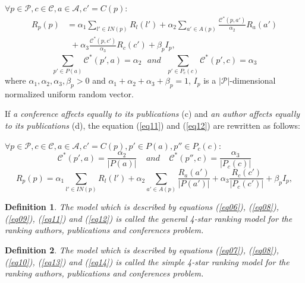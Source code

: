\documentclass[10pt,leqno,twoside]{article}
\newtheorem{definition}{\indent Definition}[section]
\begin{document}
\begin{enumerate}
$\forall p\in\mathcal{P},  c\in\mathcal{C},  a\in\mathcal{A},c' = C(p):$
\begin{equation} \label {eq11}
\begin{split}
R_p(p) &= \alpha_1\sum_{l'\in IN(p)}R_l(l') +  \alpha_2 \sum_{a'\in A(p)}\frac{\mathcal{C}^*(p,a')}{\alpha_2}R_a(a')\\ 
&~~ + \alpha_3\frac{\mathcal{C}^*(p,c')}{\alpha_3}R_c(c')+ \beta_pI_p,
\end{split}
\end{equation}
\begin{equation}\label{eq12}
\sum_{p'\in P(a)}\mathcal{C}^*(p',a)=\alpha_2~~~and~~~\sum_{p'\in P_c(c)}\mathcal{C}^*(p',c)=\alpha_3
\end{equation}
where $\alpha_1,\alpha_2,\alpha_3,\beta_p > 0$ and $\alpha_1 + \alpha_2 + \alpha_3 + \beta_p = 1$, $I_p$ is a $|\mathcal{P}|$-dimensional normalized uniform random vector.

If \textit{a conference affects equally to  its publications} (c) and \textit{an author affects equally to  its publications} (d),  the equation (\ref{eq11}) and (\ref{eq12})  are rewritten as follows:

$\forall p\in\mathcal{P},  c\in\mathcal{C},  a\in\mathcal{A},c' = C(p), p'\in P(a), p''\in P_c(c):$
\setlength{\parskip}{3pt}
\begin{equation}\label{eq13}
\mathcal{C}^*(p',a)=\frac{\alpha_2}{|P(a)|}~~~~~and~~~~~\mathcal{C}^*(p'',c)=\frac{\alpha_3}{|P_c(c)|}
\end{equation}
\begin{equation}\label{eq14}
R_p(p) = \alpha_1\sum_{l'\in IN(p)}R_l(l') + \alpha_2\sum_{a'\in A(p)}\frac{R_a(a')}{|P(a')|} + \alpha_3\frac{R_c(c')}{|P_c(c')|} + \beta_pI_p,
\end{equation}
\end{enumerate}
\begin{definition}\label{Def:4starGen}
The model which is described by equations (\ref{eq06}), (\ref{eq08}), (\ref{eq09}), (\ref{eq11}) and (\ref{eq12})
is called  \textit{ the general 4-star ranking model for the ranking authors, publications and conferences problem.}
\end{definition}
\begin{definition}\label{Def:4starSimple}
The model which is described by equations (\ref{eq07}), (\ref{eq08}), (\ref{eq10}), (\ref{eq13}) and (\ref{eq14})
is called  \textit{ the simple 4-star ranking model for the ranking authors, publications and conferences problem.}
\end{definition}
\end{document}
